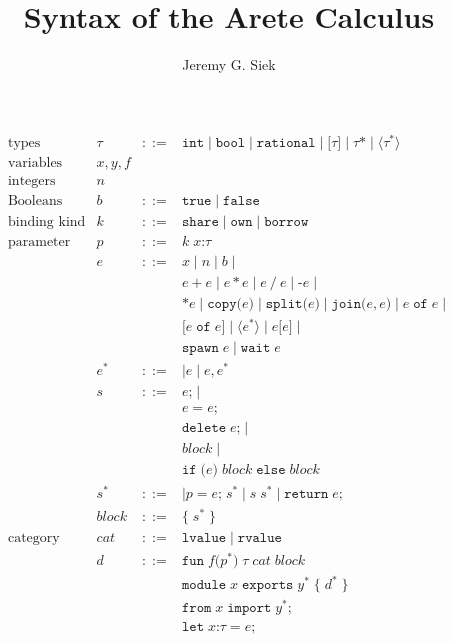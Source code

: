\documentclass{article}
\title{Syntax of the Arete Calculus}
\author{Jeremy G. Siek}
\newcommand{\SC}{\texttt{;}}
\newcommand{\LC}{\texttt{\{}}
\newcommand{\RC}{\texttt{\}}}
\newcommand{\LP}{\texttt{(}}
\newcommand{\RP}{\texttt{)}}
\newcommand{\LS}{\texttt{[}}
\newcommand{\RS}{\texttt{]}}
\newcommand{\EQ}{\mathop{\texttt{=}}}
\newcommand{\OF}{\mathop{\mathtt{of}}}
\begin{document}
\maketitle

\[
\begin{array}{lrcl}
  \text{types}& \tau & ::= & \mathtt{int} \mid \mathtt{bool} \mid
   \mathtt{rational} \mid
   \LS \tau \RS \mid \tau \texttt{*} \mid \langle \tau^{*} \rangle\\
  \text{variables} & x,y,f \\
  \text{integers} & n \\
  \text{Booleans} & b & ::= & \mathtt{true} \mid \mathtt{false}\\
 \text{binding kind} & k &::= & \mathtt{share} \mid \mathtt{own} \mid
        \mathtt{borrow} \\
 \text{parameter} & p &::= & k \; x \texttt{:} \tau \\
  & e &::= & x \mid n \mid b \mid\\
  & & & e \mathop{\texttt{+}} e \mid e \mathop{\texttt{*}} e \mid e \mathop{\texttt{/}} e \mid \texttt{-} e \mid \\
  & & & \texttt{*} e \mid \mathtt{copy}\LP e \RP \mid
        \mathtt{split}\LP e \RP \mid \mathtt{join}\LP e,e \RP \mid
        e \OF e \mid \\
  & & & \LS e \OF e \RS \mid \langle e^{*} \rangle \mid e \LS e \RS \mid \\
  & & & \mathtt{spawn}\; e \mid \mathtt{wait}\; e \\
  & e^{*} & ::= & \mid e \mid e \mathop{\texttt{,}} e^{*} \\
  & s &::= & e \SC \mid \\
  & & & e \EQ e\SC\\
  & & & \mathtt{delete}\; e \SC \mid \\
  & & & \mathit{block} \mid \\
  & & & \mathtt{if}\;\LP e \RP\;\mathit{block}\;\mathtt{else}\; \mathit{block}\\
  & s^{*} &::=& \mid p \EQ e\SC \; s^{*} \mid s \; s^{*} \mid \mathtt{return}\; e \SC \\
  & \mathit{block} &::= & \LC\; s^{*} \;\RC \\
  \text{category} & \mathit{cat} & ::= & \mathtt{lvalue} \mid \mathtt{rvalue}\\
  & d & ::= & \mathtt{fun}\; f \LP p^{*} \RP \; \tau \; \mathit{cat} \; \mathit{block}\\
  & & & \mathtt{module} \; x \;\mathtt{exports}\; y^{*} \; \LC\; d^{*} \;\RC\\
  & & & \mathtt{from} \; x \; \mathtt{import}\; y^{*} \SC\\
  & & & \mathtt{let}\; x \texttt{:} \tau \EQ e \SC 
\end{array}
\]
\end{document}
